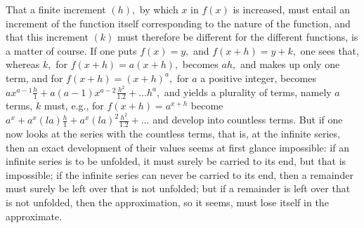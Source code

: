 \documentclass[12pt,a4paper,openany]{book}
\begin{document}
That a finite increment $(h),$ by which $x$ in $f(x)$ is increased, must entail an increment of the function itself corresponding to the nature of the function, and that this increment $(k)$ must therefore be different for the different functions, is a matter of course. If one puts $f(x)=y,$ and $f(x+h)=y+k,$ one sees that, whereas $k,$ for $f(x+h)=a(x+h),$ becomes $ah,$ and makes up only one term, and for $f(x+h)=(x+h)^{a},$ for $a$ a positive integer, becomes $ax^{a-1}\frac{h}{1}+a(a-1)x^{a-2}\frac{h^{2}}{1.2}+\ldots h^{a},$ and yields a plurality of terms, namely $a$ terms, $k$ must, e.g., for $f(x+h)=a^{x+h}$ become $a^{x}+a^{x}(la)\frac{h}{1}+a^{x}(la)^{2}\frac{h^{2}}{1.2}+\ldots$ and develop into countless terms. But if one now looks at the series with the countless terms, that is, at the infinite series, then an exact development of their values seems at first glance impossible: if an infinite series is to be unfolded, it must surely be carried to its end, but that is impossible; if the infinite series can never be carried to its end, then a remainder must surely be left over that is not unfolded; but if a remainder is left over that is not unfolded, then the approximation, so it seems, must lose itself in the approximate.
\end{document}
